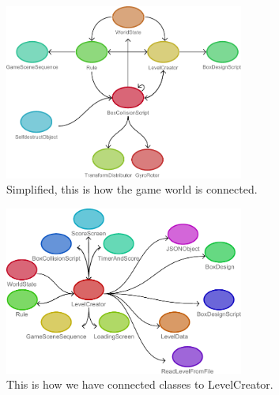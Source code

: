 \begin{figure}[ht]
        \capstart
        \centering
        \includegraphics[width=0.7\textwidth]{images/game_world_class_chart}
        \caption[World game class chart]{Simplified, this is how the game world is connected.}
        \label{fig:world_game}
\end{figure}




\begin{figure}[ht]
	\capstart
	\centering
	\includegraphics[width=0.7\textwidth]{images/LevelCreator_class_connectivity}
	\caption[LevelCreator class chart]{This is how we have connected classes to LevelCreator.}
	\label{fig:LevelCreator_chart}
\end{figure}

